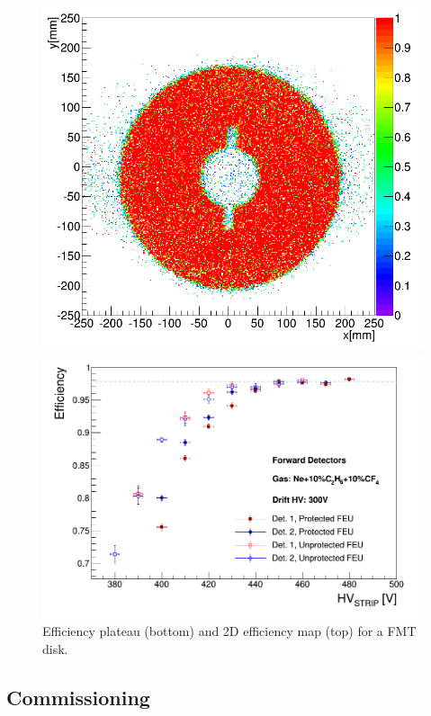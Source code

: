 \begin{figure}[htb]
 \includegraphics[width=1.0\columnwidth,keepaspectratio]{images/FMT_eff_2Dmap_testBench.png}
 
 \includegraphics[width=1.0\columnwidth,keepaspectratio]{images/FMT_eff_plateau_testBench.png}
 
 \caption{Efficiency plateau (bottom) and 2D efficiency map (top) for a FMT disk.}
 \label{fig:mm-fig9}
\end{figure}

\subsection{Commissioning}


